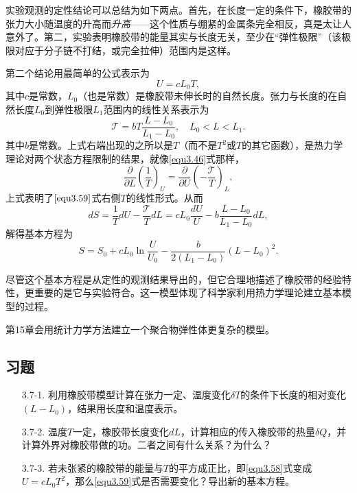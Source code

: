 实验观测的定性结论可以总结为如下两点。首先，在长度一定的条件下，橡胶带的张力大小随温度的升高而{\it 升高}——这个性质与绷紧的金属条完全相反，真是太让人意外了。第二，实验表明橡胶带的能量其实与长度无关，至少在“弹性极限”（该极限对应于分子链不打结，或完全拉伸）范围内是这样。

第二个结论用最简单的公式表示为
\begin{equation}
    U = cL_0 T,
\label{equ3.58}
\end{equation}
其中$c$是常数，$L_0$（也是常数）是橡胶带未伸长时的自然长度。张力与长度的在自然长度$L_0$到弹性极限$L_1$范围内的线性关系表示为
\begin{equation}
    \mathscr{T} = bT \frac{L - L_0}{L_1 - L_0}, \quad L_0 < L < L_1.
\label{equ3.59}
\end{equation}
其中$b$是常数。上式右端出现的之所以是$T$（而不是$T^2$或$T$的其它函数），是热力学理论对两个状态方程限制的结果，就像\eqref{equ3.46}式那样，
\begin{equation}
    \frac{\partial}{\partial L} \left( \frac{1}{T} \right)_U = \frac{\partial}{\partial U} \left( -\frac{\mathscr{T}}{T} \right)_L,
\label{equ3.60}
\end{equation}
上式表明了$\eqref{equ3.59}$式右侧$T$的线性形式。从而
\begin{equation}
    dS = \frac{1}{T} dU - \frac{\mathscr{T}}{T} dL = cL_0 \frac{dU}{U} - b \frac{L - L_0}{L_1 - L_0} dL,
\label{equ3.61}
\end{equation}
解得基本方程为
\begin{equation}
    S = S_0 + cL_0 \ln \frac{U}{U_0} - \frac{b}{2(L_1 - L_0)} (L - L_0)^2.
\label{equ3.62}
\end{equation}

尽管这个基本方程是从定性的观测结果导出的，但它合理地描述了橡胶带的经验特性，更重要的是它与实验符合。这一模型体现了科学家利用热力学理论建立基本模型的过程。

第15章会用统计力学方法建立一个聚合物弹性体更复杂的模型。

\subsection*{习题}
\begin{enumerate}
    \item[3.7-1.] 利用橡胶带模型计算在张力一定、温度变化$\delta T$的条件下长度的相对变化$(L - L_0)$，结果用长度和温度表示。
    \item[3.7-2.] 温度$T$一定，橡胶带长度变化$dL$，计算相应的传入橡胶带的热量$\delta Q$，并计算外界对橡胶带做的功。二者之间有什么关系？为什么？
    \item[3.7-3.] 若未张紧的橡胶带的能量与$T$的平方成正比，即\eqref{equ3.58}式变成$U = cL_0 T^2$，那么\eqref{equ3.59}式是否需要变化？导出新的基本方程。
\end{enumerate}

